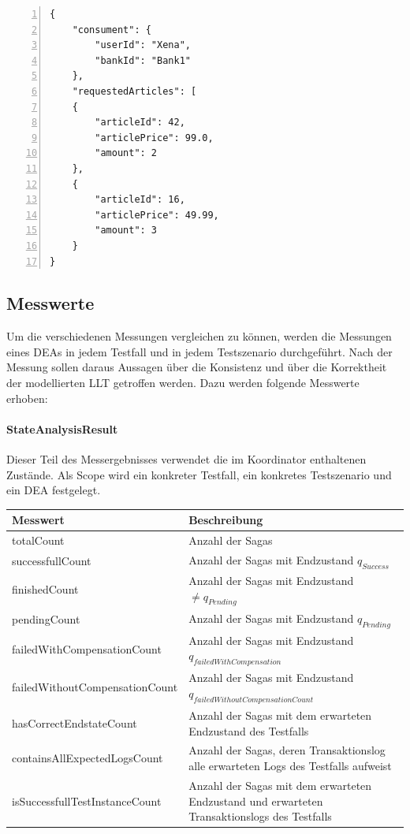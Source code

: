 \begin{lstlisting}[breaklines=true, tabsize=2, showstringspaces=false, frame=single, numbers=left, basicstyle=\small, label = {lst:PlaceOrderJson}, caption={Dynamisch generierte Bestellung}, captionpos=b] 
{
	"consument": {
		"userId": "Xena",
		"bankId": "Bank1"
	},
	"requestedArticles": [
	{
		"articleId": 42,
		"articlePrice": 99.0,
		"amount": 2
	},
	{
		"articleId": 16,
		"articlePrice": 49.99,
		"amount": 3
	}
}
\end{lstlisting}

\subsection{Messwerte}
Um die verschiedenen Messungen vergleichen zu können, werden die Messungen eines DEAs in jedem Testfall und in jedem Testszenario durchgeführt. Nach der Messung sollen daraus Aussagen über die Konsistenz und über die Korrektheit der modellierten LLT getroffen werden. Dazu werden folgende Messwerte erhoben:

\paragraph*{StateAnalysisResult}
Dieser Teil des Messergebnisses verwendet die im Koordinator enthaltenen Zustände. Als Scope wird ein konkreter Testfall, ein konkretes Testszenario und ein DEA festgelegt.

\begin{center}
\begin{longtable}[h]{|p{5cm}|p{12cm}|}
	\hline
	Messwert & Beschreibung \\ \hline
	totalCount & Anzahl der Sagas \\ \hline
	successfullCount & Anzahl der Sagas mit Endzustand $q_{Success}$ \\ \hline
	finishedCount & Anzahl der Sagas mit Endzustand $\not = q_{Pending}$ \\ \hline
	pendingCount & Anzahl der Sagas mit Endzustand $q_{Pending}$ \\ \hline
	failedWithCompensation\-Count & Anzahl der Sagas mit Endzustand $q_{failedWithCompensation}$ \\ \hline
	failedWithoutCompensation\-Count & Anzahl der Sagas mit Endzustand $q_{failedWithoutCompensationCount}$ \\ \hline
	hasCorrectEndstateCount & Anzahl der Sagas mit dem erwarteten Endzustand des Testfalls \\ \hline
	containsAllExpectedLogs\-Count & Anzahl der Sagas, deren Transaktionslog alle erwarteten Logs des Testfalls aufweist \\ \hline
	isSuccessfullTestInstance\-Count & Anzahl der Sagas mit dem erwarteten Endzustand und erwarteten Transaktionslogs des Testfalls \\ \hline
\end{longtable}
\end{center}
\FloatBarrier

